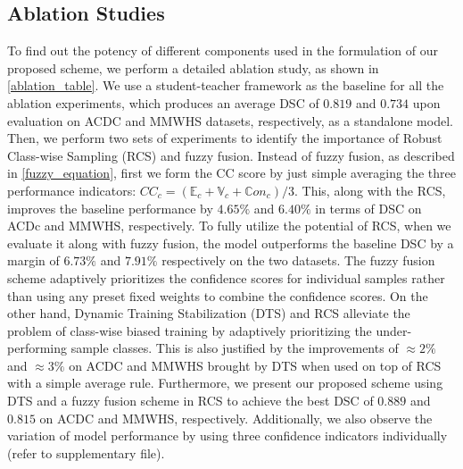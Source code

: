 \documentclass[runningheads]{llncs}
\begin{document}
\subsection{Ablation Studies}
To find out the potency of different components used in the formulation of our proposed scheme, we perform a detailed ablation study, as shown in \autoref{ablation_table}. We use a student-teacher framework as the baseline for all the ablation experiments, which produces an average DSC of $0.819$ and $0.734$ upon evaluation on ACDC and MMWHS datasets, respectively, as a standalone model. Then, we perform two sets of experiments to identify the importance of Robust Class-wise Sampling (RCS) and fuzzy fusion. Instead of fuzzy fusion, as described in \autoref{fuzzy_equation}, first we form the CC score by just simple averaging the three performance indicators: $CC_c = (\mathbb{E}_c+\mathbb{V}_c+\mathbb{C}on_c)/3$. This, along with the RCS, improves the baseline performance by $4.65\%$ and $6.40\%$ in terms of DSC on ACDc and MMWHS, respectively. To fully utilize the potential of RCS, when we evaluate it along with fuzzy fusion, the model outperforms the baseline DSC by a margin of $6.73\%$ and $7.91\%$ respectively on the two datasets. The fuzzy fusion scheme adaptively prioritizes the confidence scores for individual samples rather than using any preset fixed weights to combine the confidence scores. On the other hand, Dynamic Training Stabilization (DTS) and RCS alleviate the problem of class-wise biased training by adaptively prioritizing the under-performing sample classes. This is also justified by the improvements of $\approx 2\%$ and $\approx 3\%$ on ACDC and MMWHS brought by DTS when used on top of RCS with a simple average rule. Furthermore, we present our proposed scheme using DTS and a fuzzy fusion scheme in RCS to achieve the best DSC of $0.889$ and $0.815$ on ACDC and MMWHS, respectively. Additionally, we also observe the variation of model performance by using three confidence indicators individually (refer to supplementary file).          
\end{document}
